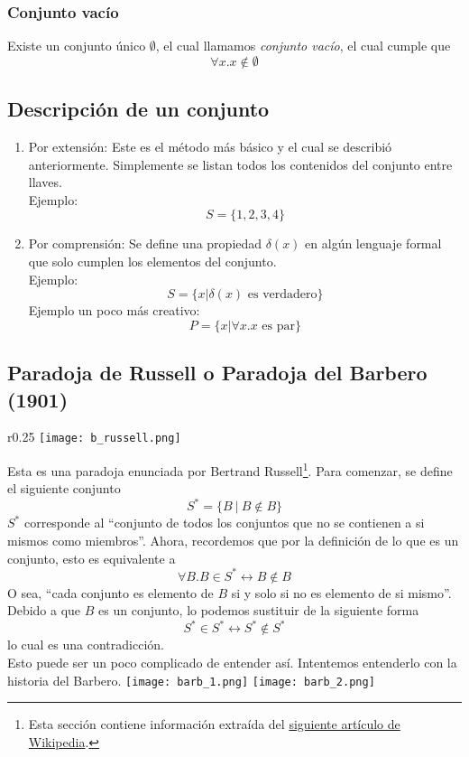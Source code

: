 \documentclass[../main.tex]{subfiles}
\begin{document}
\subsubsection{Conjunto vacío}
Existe un conjunto único $\emptyset$, el cual llamamos \textit{conjunto vacío}, el cual cumple que 
\[ \forall x . x \not\in \emptyset \]

\subsection{Descripción de un conjunto}
\begin{enumerate}
    \item Por extensión: Este es el método más básico y el cual se describió anteriormente. Simplemente se listan todos los contenidos del conjunto entre llaves.\\
    Ejemplo: \[ S = \{ 1, 2, 3, 4 \} \]
    \item Por comprensión: Se define una propiedad $\delta(x)$ en algún lenguaje formal que solo cumplen los elementos del conjunto.\\
    Ejemplo: \[ S = \{ x | \delta(x) \text{ es verdadero} \} \]
    Ejemplo un poco más creativo: \[ P = \{ x | \forall x . x \text{ es par} \} \]
\end{enumerate}

\subsection{Paradoja de Russell o Paradoja del Barbero (1901)}
\begin{wrapfigure}{r}{0.25\textwidth}
    \centering
    \texttt{[image: b\_russell.png]}
\end{wrapfigure}
Esta es una paradoja enunciada por Bertrand Russell\footnote{Esta sección contiene información extraída del \href{https://es.wikipedia.org/wiki/Paradoja_de_Russell}{siguiente artículo de Wikipedia}.}. Para comenzar, se define el siguiente conjunto
\[ S^* = \{ B \  | \  B \not\in B \} \]
$S^*$ corresponde al ``conjunto de todos los conjuntos que no se contienen a si mismos como miembros''. Ahora, recordemos que por la definición de lo que es un conjunto, esto es equivalente a
\[ \forall B . B \in S^* \leftrightarrow B \not\in B \]
O sea, ``cada conjunto es elemento de $B$ si y solo si no es elemento de si mismo''. Debido a que $B$ es un conjunto, lo podemos sustituir de la siguiente forma
\[ S^* \in S^* \leftrightarrow S^* \not\in S^* \]
lo cual es una contradicción.\\
Esto puede ser un poco complicado de entender así. Intentemos entenderlo con la historia del Barbero.
\texttt{[image: barb\_1.png]}
\texttt{[image: barb\_2.png]}
\end{document}
